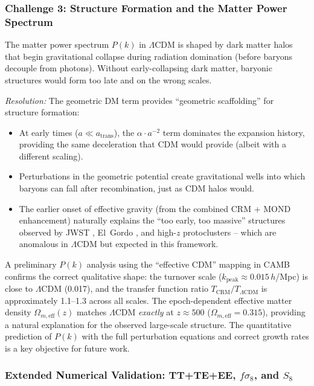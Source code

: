 \documentclass[aps,prd,twocolumn,superscriptaddress,nofootinbib,floatfix]{revtex4-2}
\begin{document}
\subsubsection{Challenge 3: Structure Formation and the Matter Power Spectrum}

The matter power spectrum $P(k)$ in $\Lambda$CDM is shaped by dark matter halos that begin gravitational collapse during radiation domination (before baryons decouple from photons). Without early-collapsing dark matter, baryonic structures would form too late and on the wrong scales.

\textit{Resolution:} The geometric DM term provides ``geometric scaffolding'' for structure formation:
\begin{itemize}
\item At early times ($a \ll a_{\mathrm{trans}}$), the $\alpha \cdot a^{-2}$ term dominates the expansion history, providing the same deceleration that CDM would provide (albeit with a different scaling).
\item Perturbations in the geometric potential create gravitational wells into which baryons can fall after recombination, just as CDM halos would.
\item The earlier onset of effective gravity (from the combined CRM + MOND enhancement) naturally explains the ``too early, too massive'' structures observed by JWST \cite{Labbe2023}, El~Gordo \cite{Asencio2023}, and high-$z$ protoclusters \cite{Miller2018} -- which are anomalous in $\Lambda$CDM but expected in this framework.
\end{itemize}

A preliminary $P(k)$ analysis using the ``effective CDM'' mapping in CAMB \cite{Lewis2000} confirms the correct qualitative shape: the turnover scale ($k_{\mathrm{peak}} \approx 0.015$\,$h$/Mpc) is close to $\Lambda$CDM (0.017), and the transfer function ratio $T_{\mathrm{CRM}}/T_{\Lambda\mathrm{CDM}}$ is approximately 1.1--1.3 across all scales. The epoch-dependent effective matter density $\Omega_{m,\mathrm{eff}}(z)$ matches $\Lambda$CDM \textit{exactly} at $z \approx 500$ ($\Omega_{m,\mathrm{eff}} = 0.315$), providing a natural explanation for the observed large-scale structure. The quantitative prediction of $P(k)$ with the full perturbation equations and correct growth rates is a key objective for future work.

\subsubsection{Extended Numerical Validation: TT+TE+EE, \texorpdfstring{$f\sigma_8$}{f sigma\_8}, and \texorpdfstring{$S_8$}{S\_8}}
\label{subsubsec:extended_validation}
\end{document}
